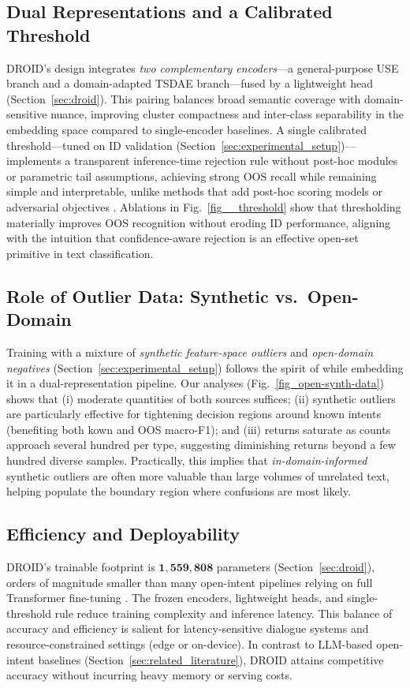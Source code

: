 \documentclass[journal,letterpaper]{IEEEtran}
\begin{document}
\subsection{Dual Representations and a Calibrated Threshold}
DROID’s design integrates \emph{two complementary encoders}---a general-purpose USE branch and a domain-adapted TSDAE branch---fused by a lightweight head (Section~\ref{sec:droid}). This pairing balances broad semantic coverage with domain-sensitive nuance, improving cluster compactness and inter-class separability in the embedding space compared to single-encoder baselines. A single calibrated threshold—tuned on ID validation (Section~\ref{sec:experimental_setup})—implements a transparent inference-time rejection rule without post-hoc modules or parametric tail assumptions, achieving strong OOS recall while remaining simple and interpretable, unlike methods that add post-hoc scoring models or adversarial objectives \cite{xu-etal-2021-unsupervised,Zhang_2021,DA-ADB_2023}. Ablations in Fig.~\ref{fig__threshold} show that thresholding materially improves OOS recognition without eroding ID performance, aligning with the intuition that confidence-aware rejection is an effective open-set primitive in text classification.

\subsection{Role of Outlier Data: Synthetic vs.\ Open-Domain}
Training with a mixture of \emph{synthetic feature-space outliers} and \emph{open-domain negatives} (Section~\ref{sec:experimental_setup}) follows the spirit of \cite{Zhan_2021} while embedding it in a dual-representation pipeline. Our analyses (Fig.~\ref{fig_open-synth-data}) shows that (i) moderate quantities of both sources suffices; (ii) synthetic outliers are particularly effective for tightening decision regions around known intents (benefiting both kown and OOS macro-F1); and (iii) returns saturate as counts approach several hundred per type, suggesting diminishing returns beyond a few hundred diverse samples. Practically, this implies that \emph{in-domain-informed} synthetic outliers are often more valuable than large volumes of unrelated text, helping populate the boundary region where confusions are most likely.

\subsection{Efficiency and Deployability}
DROID’s trainable footprint is $\mathbf{1{,}559{,}808}$ parameters (Section~\ref{sec:droid}), orders of magnitude smaller than many open-intent pipelines relying on full Transformer fine-tuning \cite{Zhan_2021}. The frozen encoders, lightweight heads, and single-threshold rule reduce training complexity and inference latency. This balance of accuracy and efficiency is salient for latency-sensitive dialogue systems and resource-constrained settings (edge or on-device). In contrast to LLM-based open-intent baselines (Section~\ref{sec:related_literature}), DROID attains competitive accuracy without incurring heavy memory or serving costs.
\end{document}
